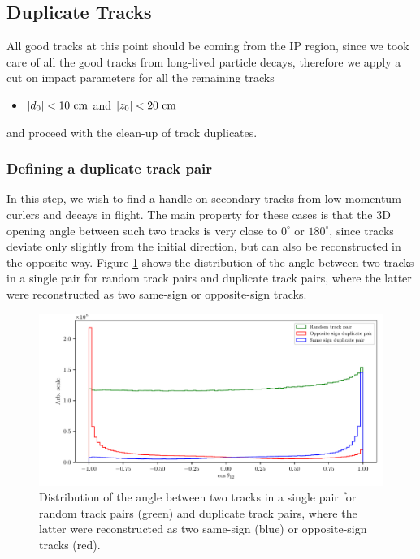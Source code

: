 \subsection{Duplicate Tracks}
All good tracks at this point should be coming from the IP region, since we took care of all the good tracks from long-lived particle decays, therefore we apply a cut on impact parameters for all the remaining tracks
\begin{itemize}
	\item $\vert d_0 \vert < 10\mathrm{~cm}$ and $\vert z_0 \vert < 20\mathrm{~cm}$
\end{itemize} 

and proceed with the clean-up of track duplicates.

\subsubsection{Defining a duplicate track pair}

In this step, we wish to find a handle on secondary tracks from low momentum curlers and decays in flight. The main property for these cases is that the 3D opening angle between such two tracks is very close to $0^\circ$ or $180^\circ$, since tracks deviate only slightly from the initial direction, but can also be reconstructed in the opposite way. Figure \ref{fig:ROE_dupAngleInit} shows the distribution of the angle between two tracks in a single pair for random track pairs and duplicate track pairs, where the latter were reconstructed as two same-sign or opposite-sign tracks.

\begin{figure}[H]
	\centering
	\captionsetup{width=0.8\linewidth}
	\includegraphics[width=\linewidth]{fig/ROECleanup_dup_angle_initial}
	\caption{Distribution of the angle between two tracks in a single pair for random track pairs (green) and duplicate track pairs, where the latter were reconstructed as two same-sign (blue) or opposite-sign tracks (red).}
	\label{fig:ROE_dupAngleInit}
\end{figure}

